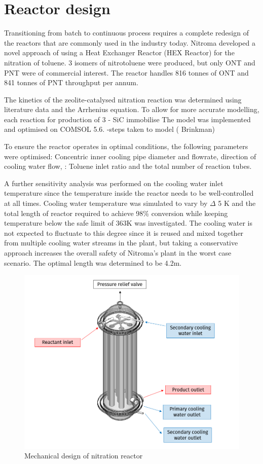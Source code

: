 \section*{Reactor design}
Transitioning from batch to continuous process requires a complete redesign of the reactors that are commonly used in the industry today. Nitroma developed a novel approach of using a Heat Exchanger Reactor (HEX Reactor) for the nitration of toluene. 3 isomers of nitrotoluene were produced, but only ONT and PNT were of commercial interest. The reactor handles 816 tonnes of ONT and 841 tonnes of PNT throughput per annum. 

The kinetics of the zeolite-catalysed nitration reaction was determined using literature data and the Arrhenius equation. To allow for more accurate modelling, each reaction for production of 3 
- SiC immobilise
The model was implemented and optimised on COMSOL 5.6. 
-steps taken to model ( Brinkman) 

To ensure the reactor operates in optimal conditions, the following parameters were optimised: Concentric inner cooling pipe diameter and flowrate, direction of cooling water flow,  : Toluene inlet ratio and the total number of reaction tubes.



A further sensitivity analysis was performed on the cooling water inlet temperature since the temperature inside the reactor needs to be well-controlled at all times. Cooling water temperature was simulated to vary by \mypm $\Delta$ 5 K and the total length of reactor required to achieve 98\% conversion while keeping temperature below the safe limit of 363K was investigated. The cooling water is not expected to fluctuate to this degree since it is reused and mixed together from multiple cooling water streams in the plant, but taking a conservative approach increases the overall safety of Nitroma's plant in the worst case scenario. The optimal length was determined to be 4.2m. 


\begin{figure}[h]
    \centering
    \includegraphics[width=0.7\linewidth]{chapters/0-executive-summary/figures/FYD executive sum.PNG}
    \caption{Mechanical design of nitration reactor}
    \label{fig:executivesummaryreactor}
\end{figure}